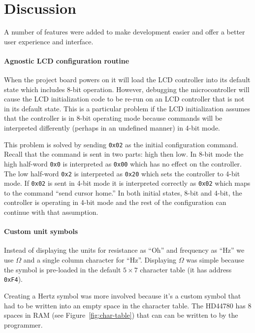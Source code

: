 \section{Discussion}\label{sec:discussion}

A number of features were added to make development easier and offer a better user experience and interface.

\paragraph{Agnostic LCD configuration routine} When the project board powers on it will load the LCD controller into its default state which includes 8-bit operation.
However, debugging the microcontroller will cause the LCD initialization code to be re-run on an LCD controller that is not in its default state.
This is a particular problem if the LCD initialization assumes that the controller is in 8-bit operating mode because commands will be interpreted differently (perhaps in an undefined manner) in 4-bit mode.

This problem is solved by sending \texttt{0x02} as the initial configuration command.
Recall that the command is sent in two parts: high then low.
In 8-bit mode the high half-word \texttt{0x0} is interpreted as \texttt{0x00} which has no effect on the controller.
The low half-word \texttt{0x2} is interpreted as \texttt{0x20} which sets the controller to 4-bit mode.
If \texttt{0x02} is sent in 4-bit mode it is interpreted correctly as \texttt{0x02} which maps to the command ``send cursor home.'' In both initial states, 8-bit and 4-bit, the controller is operating in 4-bit mode and the rest of the configuration can continue with that assumption.

\paragraph{Custom unit symbols} Instead of displaying the units for resistance as ``Oh'' and frequency as ``Hz'' we use $\Omega$ and a single column character for ``Hz''.
Displaying $\Omega$ was simple because the symbol is pre-loaded in the default $5\times7$ character table (it has address \texttt{0xF4}).

Creating a Hertz symbol was more involved because it's a custom symbol that had to be written into an empty space in the character table.
The HD44780 has 8 spaces in RAM (see Figure~\ref{fig:char-table}) that can can be written to by the programmer.

